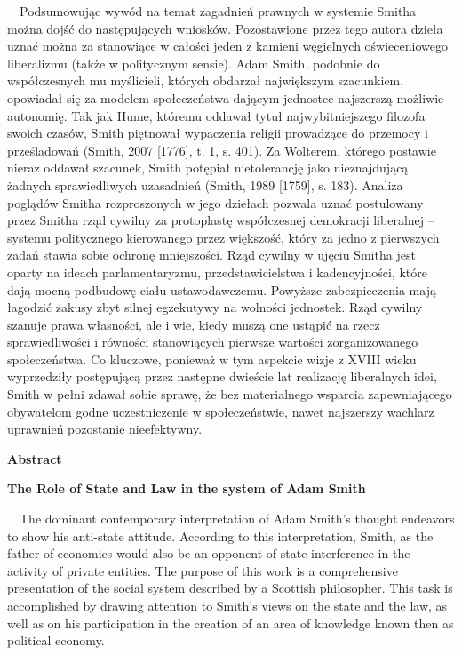 \documentclass[a4paper]{article}
\begin{document}
 \ \ Podsumowując wywód na temat zagadnień prawnych w systemie Smitha można dojść do następujących wniosków.
Pozostawione przez tego autora dzieła uznać można za stanowiące w całości jeden z kamieni węgielnych oświeceniowego
liberalizmu (także w politycznym sensie). Adam Smith, podobnie do współczesnych mu myślicieli, których obdarzał
największym szacunkiem, opowiadał się za modelem społeczeństwa dającym jednostce najszerszą możliwie autonomię. Tak jak
Hume, któremu oddawał tytuł najwybitniejszego filozofa swoich czasów, Smith piętnował wypaczenia religii prowadzące do
przemocy i prześladowań \label{ref:RNDWdGETBWW27}(Smith, 2007 [1776], t. 1, s. 401). Za Wolterem, którego postawie
nieraz oddawał szacunek, Smith potępiał nietolerancję jako nieznajdującą żadnych sprawiedliwych uzasadnień
\label{ref:RNDcOFI1QT8Tr}(Smith, 1989 [1759], s. 183). Analiza poglądów Smitha rozproszonych w jego dziełach pozwala
uznać postulowany przez Smitha rząd cywilny za protoplastę współczesnej demokracji liberalnej – systemu politycznego
kierowanego przez większość, który za jedno z pierwszych zadań stawia sobie ochronę mniejszości. Rząd cywilny w ujęciu
Smitha jest oparty na ideach parlamentaryzmu, przedstawicielstwa i kadencyjności, które dają mocną podbudowę ciału
ustawodawczemu. Powyższe zabezpieczenia mają łagodzić zakusy zbyt silnej egzekutywy na wolności jednostek. Rząd cywilny
szanuje prawa własności, ale i wie, kiedy muszą one ustąpić na rzecz sprawiedliwości i równości stanowiących pierwsze
wartości zorganizowanego społeczeństwa. Co kluczowe, ponieważ w tym aspekcie wizje z XVIII wieku wyprzedziły
postępującą przez następne dwieście lat realizację liberalnych idei, Smith w pełni zdawał sobie sprawę, że bez
materialnego wsparcia zapewniającego obywatelom godne uczestniczenie w społeczeństwie, nawet najszerszy wachlarz
uprawnień pozostanie nieefektywny.

{\bfseries
Abstract}

{\bfseries
The Role of State and Law in the system of Adam Smith}

\ \ The dominant contemporary interpretation of Adam Smith's thought endeavors to show his anti-state attitude.
According to this interpretation, Smith, as the father of economics would also be an opponent of state interference in
the activity of private entities. The purpose of this work is a comprehensive presentation of the social system
described by a Scottish philosopher. This task is accomplished by drawing attention to Smith's views on the state and
the law, as well as on his participation in the creation of an area of knowledge known then as political economy.
\end{document}
